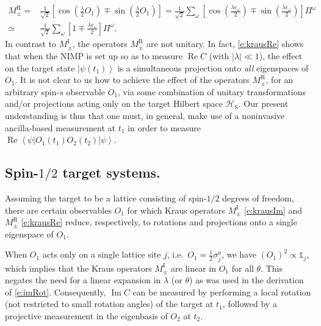 \documentclass[epjST,numbook]{svjour}
\newcommand{\ket}[1]{\left \vert #1 \right >}
\newcommand{\matel}[3]{ \displaystyle \left\langle #1 \right \vert #2 \left\vert  #3 \right\rangle }
\DeclareMathOperator{\imp }{\mathrm{Im}}
\DeclareMathOperator{\rep}{\mathrm{Re}}
\begin{document}
\begin{equation}\label{e:krausRe}
\begin{split}
	M_\pm^\text{R}=&\frac{1}{\sqrt{2}} \left[\cos\left(\frac{\lambda}{2}O_1 \right) \mp \sin\left(\frac{\lambda}{2}O_1\right)\right] = \frac{1}{\sqrt{2}} \sum_\omega \left[ \cos \left( \frac{\lambda e_\omega}{2} \right) \mp \sin\left(\frac{\lambda e_\omega}{2}\right)\right] \Pi^\omega \\
	\simeq& \frac{1}{\sqrt{2}} \sum_\omega \left[ 1 \mp \frac{\lambda e_\omega}{2}\right] \Pi^\omega.
\end{split}
\end{equation}
In contrast to $M_\pm^\text{I}$, the operators $M_\pm^\text{R}$ are not unitary. In fact, \eqref{e:krausRe} shows that when the NIMP is set up so as to measure $\rep C$ (with $|\lambda|\ll1$), the effect on the target state $\ket{\psi(t_1)}$ is a simultaneous projection  onto \emph{all} eigenspaces of $O_1$. It is not clear to us how to achieve the effect of the operators $M_\pm^\text{R}$, for an arbitrary spin-$s$ observable $O_1$, via some combination of unitary transformations and/or projections acting only on the target Hilbert space $\mathscr{H}_\text{S}$. Our present understanding is thus that one must, in general, make use of a noninvasive ancilla-based measurement at $t_1$ in order to measure $\rep \matel{\psi}{O_1(t_1)O_2(t_2)}{\psi}$.

\subsection{Spin-$1/2$ target systems.}
Assuming the target to be a lattice consisting of spin-$1/2$ degrees of freedom, there are certain observables $O_1$ for which Kraus operators $M_\pm^\text{I}$ \eqref{e:krausIm} and $M_\pm^\text{R}$ \eqref{e:krausRe} reduce, respectively, to rotations and projections onto a single eigenspace of $O_1$.

When $O_1$ acts only on a single lattice site $j$, i.e.\ $O_1=\frac{1}{2}\sigma_j^a$, we have $(O_1)^2\propto \mathds{1}_j$, which implies that the Kraus operators $M_\pm^\text{I}$ are linear in $O_1$ for all $\theta$. This negates the need for a linear expansion in $\lambda$ (or $\theta$) as was used in the derivation of \eqref{e:imRot}. Consequently, $\imp C$ can be measured by performing a local rotation (not restricted to small rotation angles) of the target at $t_1$, followed by a projective measurement in the eigenbasis of $O_2$ at $t_2$.
\end{document}
